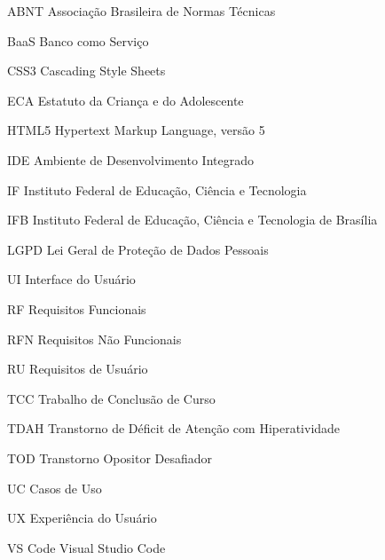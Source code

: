 
\begin{siglas}
    \item[ABNT] Associação Brasileira de Normas Técnicas
    \item[BaaS] Banco como Serviço
    \item[CSS3] Cascading Style Sheets
    \item[ECA] Estatuto da Criança e do Adolescente
    \item[HTML5] Hypertext Markup Language, versão 5
    \item[IDE] Ambiente de Desenvolvimento Integrado
    \item[IF] Instituto Federal de Educação, Ciência e Tecnologia
    \item[IFB] Instituto Federal de Educação, Ciência e Tecnologia de Brasília
    \item[LGPD]Lei Geral de Proteção de Dados Pessoais
    \item[UI] Interface do Usuário
    \item[RF] Requisitos Funcionais
    \item[RFN] Requisitos Não Funcionais
    \item[RU] Requisitos de Usuário
    \item[TCC] Trabalho de Conclusão de Curso
    \item[TDAH] Transtorno de Déficit de Atenção com Hiperatividade
    \item[TOD] Transtorno Opositor Desafiador
    \item[UC] Casos de Uso
    \item[UX] Experiência do Usuário
    \item[VS Code] Visual Studio Code
\end{siglas}

